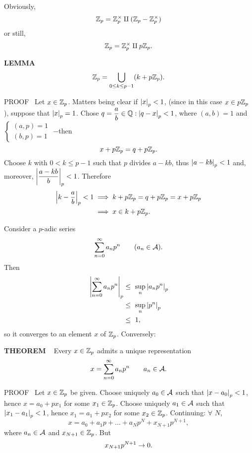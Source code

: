 Obviously, 
\[
\mathbb{Z}_p = \mathbb{Z}_p^\times \amalg (\mathbb{Z}_p - \mathbb{Z}_p^\times)
\]
or still, 
\[
\mathbb{Z}_p = \mathbb{Z}_p^\times \amalg p\mathbb{Z}_p.
\]
\begin{x}{\small\bf LEMMA} \ %
\[
\mathbb{Z}_p = \bigcup\limits_{0 \le k \le p-1} (k + p\mathbb{Z}_p).
\]

\indent PROOF \   
Let $x \in \mathbb{Z}_p$.  Matters being clear if $\left\vert x\right\vert_p < 1$, (since in this case $x \in p\mathbb{Z}_p$), suppose that $\left\vert x\right\vert_p = 1$.  Chose $q = \displaystyle\frac{a}{b} \in \mathbb{Q}: \left\vert q - x\right\vert_p < 1$, where $(a,b) = 1$ and 
$
\begin{cases}
(a,p) = 1\\
(b,p) = 1
\end{cases}
$
$-$then
\[
x + p\mathbb{Z}_p = q + p\mathbb{Z}_p.
\]
Choose $k$ with $ 0 < k \le p-1$ such that  $p$ divides $a - kb$, thus $\left\vert a - kb\right\vert_p < 1$ and, moreover, 
$\left\vert\displaystyle\frac{a - kb}{b}\right\vert_p < 1$.  Therefore
\[
\begin{aligned}
\left\vert k - \displaystyle\frac{a}{b}\right\vert_p < 1 
&\implies k + p\mathbb{Z}_p = q + p\mathbb{Z}_p = x + p\mathbb{Z}_p \\
&\implies x \in k + p\mathbb{Z}_p.
\end{aligned}
\]

Consider a $p$-adic series
\[
\sum_{n=0}^\infty a_np^n		\qquad (a_n \in \mathcal{A}).
\]
Then
\[
\begin{aligned}
\left\vert\sum_{n=0}^\infty a_n p^n\right\vert_p 
&\le \ \sup_n \left\vert a_np^n\right\vert_p \\
&\le \ \sup_n \left\vert p^n\right\vert_p \\
&\le \ 1,
\end{aligned}
\]
so it converges to an element $x$ of $\mathbb{Z}_p $.  Conversely:
\end{x}
\vspace{0.1cm}


\begin{x}{\small\bf THEOREM} \ %
Every $x \in \mathbb{Z}_p$ admits a unique representation
\[
x = \sum_{n=0}^\infty a_np^n		\qquad \text{$a_n \in \mathcal{A}$}.
\]

\indent PROOF \   
Let $x \in \mathbb{Z}_p$ be given.  
Choose uniquely $a_0 \in \mathcal{A}$ such that $\left\vert x - a_0\right\vert_p < 1$, hence $x = a_0 + px_1$ for some $x_1 \in \mathbb{Z}_p$.  
Choose uniquely $a_1 \in \mathcal{A} $ such that $\left\vert x_1 - a_1\right\vert_p < 1$, hence $x_1 = a_1 + p x_2$ for some $x_2 \in \mathbb{Z}_p$.  Continuing: $\forall$ $N$,
\[
x = a_0 + a_1p + \dots + a_Np^N + x_{N+1}p^{N+1},
\]
where $a_n \in \mathcal{A}$ and $x_{N+1} \in \mathbb{Z}_p$.  But
\[
x_{N+1}p^{N+1} \rightarrow 0.
\]
\end{x}
\vspace{0.1cm}

